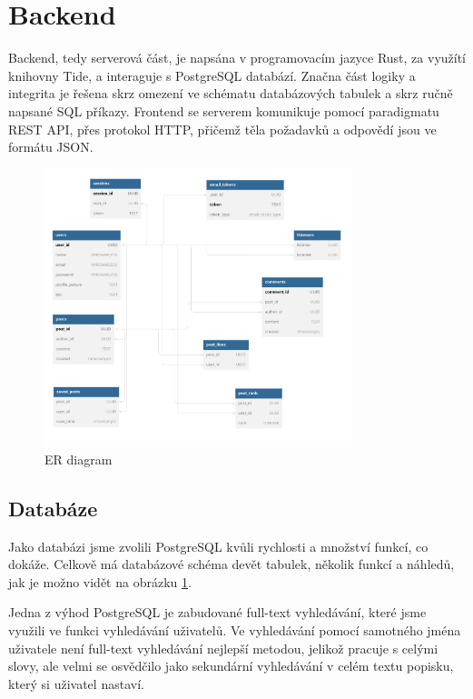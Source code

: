 \section{Backend}

Backend, tedy serverová část, je napsána v programovacím jazyce Rust, za využítí 
knihovny Tide, a interaguje
s PostgreSQL databází. Značna část logiky a integrita je řešena skrz omezení ve
schématu databázových tabulek a skrz ručně napsané SQL příkazy. Frontend se serverem
komunikuje pomocí paradigmatu REST API, přes protokol HTTP, přičemž těla požadavků a
odpovědí jsou ve formátu JSON.

\begin{figure}[h!] 
    \centering
    \includegraphics[width=0.8\textwidth]{images/er-diagram.png}
    \caption{ER diagram}
    \label{er-diagram}
\end{figure}

\subsection{Databáze}

Jako databázi jsme zvolili PostgreSQL kvůli rychlosti a množství funkcí, co dokáže.
Celkově má databázové schéma devět tabulek, několik funkcí a náhledů, jak je možno vidět
na obrázku \ref{er-diagram}.

Jedna z výhod PostgreSQL je zabudované full-text vyhledávání, které jsme využili
ve funkci vyhledávání uživatelů. Ve vyhledávání pomocí samotného jména uživatele není
full-text vyhledávání nejlepší metodou, jelikož pracuje s celými slovy, ale velmi se osvědčilo
jako sekundární vyhledávání v celém textu popisku, který si uživatel nastaví.

